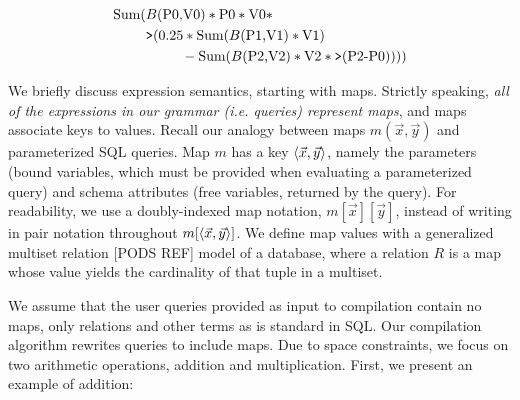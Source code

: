 
\vspace{-3mm}
\begin{align*}
\mbox{Sum}(
& B(\mbox{P0,V0}) * \mbox{P0} * \mbox{V0} *\\
& \mbox{{\tt >}}(0.25 * \mbox{Sum}(B(\mbox{P1,V1}) * \mbox{V1}) \\
& \qquad \; \; - \mbox{Sum}(B(\mbox{P2,V2}) * \mbox{V2} * \mbox{{\tt >}}(\mbox{P2-P0}))))
\end{align*}

We briefly discuss expression semantics, starting with maps. Strictly speaking,
\textit{all of the expressions in our grammar (i.e. queries) represent maps},
and maps associate keys to values. Recall our analogy between maps
$m(\vec{x},\vec{y})$ and parameterized SQL queries. Map $m$ has a key
${\langle\vec{x},\vec{y}\rangle}$, namely the parameters (bound variables, which must be
provided when evaluating a parameterized query) and schema attributes (free
variables, returned by the query). For readability, we use a doubly-indexed map
notation, $m[\vec{x}][\vec{y}]$, instead of writing in pair notation throughout
$m[{\langle\vec{x}, \vec{y}\rangle}]$. We define map values with a generalized multiset
relation [PODS REF] model of a database, where a relation $R$ is a map whose
value yields the cardinality of that tuple in a multiset.

We assume that the user queries provided as input to compilation contain no
maps, only relations and other terms as is standard in SQL. Our compilation
algorithm rewrites queries to include maps. Due to space constraints, we focus
on two arithmetic operations, addition and multiplication. First, we present an
example of addition:

